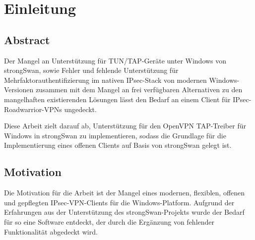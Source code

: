 


\section{Einleitung}
\subsection{Abstract}
Der Mangel an Unterstützung für TUN/TAP-Geräte unter Windows von strongSwan, sowie Fehler und
fehlende Unterstützung für Mehrfaktorauthentifizierung im nativen IPsec-Stack von modernen
Windows-Versionen zusammen mit dem Mangel an frei verfügbaren Alternativen zu den mangelhaften existierenden Lösungen
lässt den Bedarf an einem Client für IPsec-Roadwarrior-VPNs ungedeckt.

Diese Arbeit zielt darauf ab, Unterstützung für den OpenVPN TAP-Treiber
für Windows in strongSwan zu implementieren, sodass die Grundlage für die Implementierung
eines offenen Clients auf Basis von strongSwan gelegt ist.

\subsection{Motivation}
Die Motivation für die Arbeit ist der Mangel eines modernen, flexiblen, offenen
und  gepflegten IPsec-VPN-Clients für die Windows-Platform.
Aufgrund der Erfahrungen aus der Unterstützung des strongSwan-Projekts wurde
der Bedarf für so eine Software entdeckt, der durch die Ergänzung von fehlender
Funktionalität abgedeckt wird.

\BlankPage
{}

